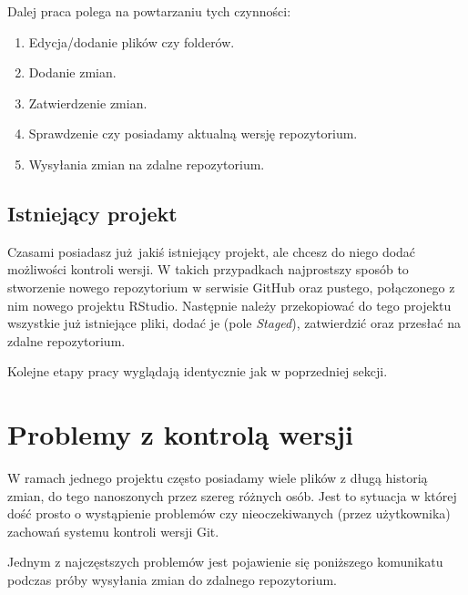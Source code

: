 \documentclass[paper=6in:9in,pagesize=pdftex,headinclude=on,footinclude=on,10pt]{scrbook}
\providecommand{\tightlist}{%
  \setlength{\itemsep}{0pt}\setlength{\parskip}{0pt}}
\begin{document}
Dalej praca polega na powtarzaniu tych czynności:

\begin{enumerate}
\def\labelenumi{\arabic{enumi}.}
\tightlist
\item
  Edycja/dodanie plików czy folderów.
\item
  Dodanie zmian.
\item
  Zatwierdzenie zmian.
\item
  Sprawdzenie czy posiadamy aktualną wersję repozytorium.
\item
  Wysyłania zmian na zdalne repozytorium.
\end{enumerate}

\hypertarget{istniejacy-projekt}{%
\subsection{Istniejący projekt}\label{istniejacy-projekt}}

Czasami posiadasz już~jakiś istniejący projekt, ale chcesz do niego dodać możliwości kontroli wersji.
W takich przypadkach najprostszy sposób to stworzenie nowego repozytorium w serwisie GitHub oraz pustego, połączonego z nim nowego projektu RStudio.
Następnie należy przekopiować do tego projektu wszystkie już istniejące pliki, dodać je (pole \emph{Staged}), zatwierdzić oraz przesłać na zdalne repozytorium.

Kolejne etapy pracy wyglądają identycznie jak w poprzedniej sekcji.

\hypertarget{problemy-z-kontrola-wersji}{%
\section{Problemy z kontrolą wersji}\label{problemy-z-kontrola-wersji}}

W ramach jednego projektu często posiadamy wiele plików z długą historią zmian, do tego nanoszonych przez szereg różnych osób.
Jest to sytuacja w której dość prosto o wystąpienie problemów czy nieoczekiwanych (przez użytkownika) zachowań systemu kontroli wersji Git.

Jednym z najczęstszych problemów jest pojawienie się poniższego komunikatu podczas próby wysyłania zmian do zdalnego repozytorium.
\end{document}
